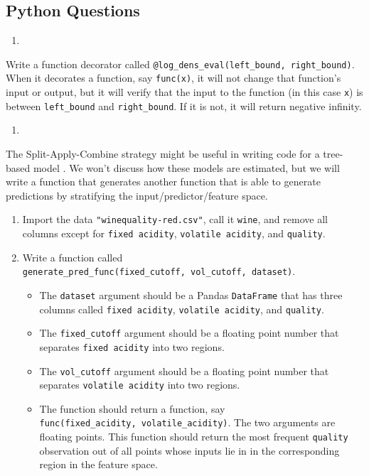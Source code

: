 \documentclass[12pt,krantz2]{krantz}
\providecommand{\tightlist}{%
  \setlength{\itemsep}{0pt}\setlength{\parskip}{0pt}}
\begin{document}
\hypertarget{python-questions-12}{%
\subsection{Python Questions}\label{python-questions-12}}

\begin{enumerate}
\def\labelenumi{\arabic{enumi}.}
\item
\end{enumerate}

Write a function decorator called \texttt{@log\_dens\_eval(left\_bound,\ right\_bound)}. When it decorates a function, say \texttt{func(x)}, it will not change that function's input or output, but it will verify that the input to the function (in this case \texttt{x}) is between \texttt{left\_bound} and \texttt{right\_bound}. If it is not, it will return negative infinity.

\begin{enumerate}
\def\labelenumi{\arabic{enumi}.}
\setcounter{enumi}{1}
\item
\end{enumerate}

The Split-Apply-Combine strategy might be useful in writing code for a tree-based model \citep{trees}. We won't discuss how these models are estimated, but we will write a function that generates another function that is able to generate predictions by stratifying the input/predictor/feature space.

\begin{enumerate}
\def\labelenumi{\alph{enumi})}
\tightlist
\item
  Import the data \texttt{"winequality-red.csv"}, call it \texttt{wine}, and remove all columns except for \texttt{fixed\ acidity}, \texttt{volatile\ acidity}, and \texttt{quality}.
\item
  Write a function called \texttt{generate\_pred\_func(fixed\_cutoff,\ vol\_cutoff,\ dataset)}.

  \begin{itemize}
  \tightlist
  \item
    The \texttt{dataset} argument should be a Pandas \texttt{DataFrame} that has three columns called \texttt{fixed\ acidity}, \texttt{volatile\ acidity}, and \texttt{quality}.
  \item
    The \texttt{fixed\_cutoff} argument should be a floating point number that separates \texttt{fixed\ acidity} into two regions.
  \item
    The \texttt{vol\_cutoff} argument should be a floating point number that separates \texttt{volatile\ acidity} into two regions.
  \item
    The function should return a function, say \texttt{func(fixed\_acidity,\ volatile\_acidity)}. The two arguments are floating points. This function should return the most frequent \texttt{quality} observation out of all points whose inputs lie in in the corresponding region in the feature space.
  \end{itemize}
\end{enumerate}
\end{document}
